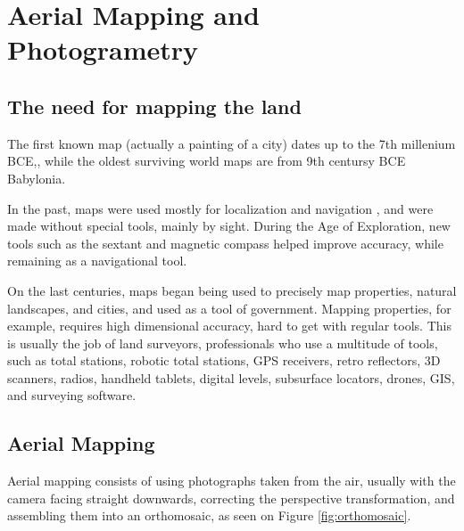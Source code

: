 

\chapter{Aerial Mapping and Photogrametry} \label{chap:AerialMapping}



\section{The need for mapping the land}
The first known map (actually a painting of a city) dates up to the 7th millenium BCE,\cite{map1}, while the oldest surviving world maps are from 9th centursy BCE Babylonia\cite{map2}.

In the past, maps were used mostly for localization and navigation %
, and were made without special tools, mainly by sight. During the Age of Exploration, new tools such as the sextant and magnetic compass helped improve accuracy, while remaining as a navigational tool.

On the last centuries, maps began being used to precisely map properties, natural landscapes, and cities, and used as a tool of government\cite{mapgovernment}. Mapping properties, for example, requires high dimensional accuracy, hard to get with regular tools. This is usually the job of land surveyors, professionals who use a multitude of tools, such as total stations, robotic total stations, GPS receivers, retro reflectors, 3D scanners, radios, handheld tablets, digital levels, subsurface locators, drones, GIS, and surveying software.


\section{Aerial Mapping}
Aerial mapping consists of using photographs taken from the air, usually with the camera facing straight downwards, correcting the perspective transformation, and assembling them into an orthomosaic, as seen on Figure \ref{fig:orthomosaic}.

